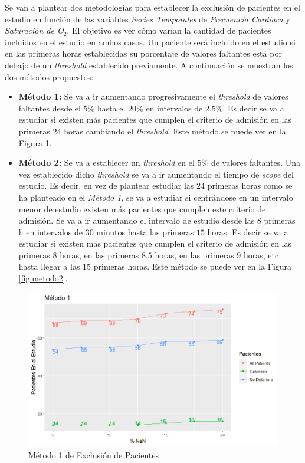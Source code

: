 \newpage

Se van a plantear dos metodologías para establecer la exclusión de pacientes en el estudio en función de las variables \textit{Series Temporales} de \textit{Frecuencia Cardiaca} y \textit{Saturación de O$_2$}. El objetivo es ver cómo varían la cantidad de pacientes incluidos en el estudio en ambos casos. Un paciente será incluido en el estudio si en las primeras horas establecidas su porcentaje de valores faltantes está por debajo de un \textit{threshold} establecido previamente. A continuación se muestran los dos métodos propuestos: 

\begin{itemize}
    \item \textbf{Método 1:} Se va a ir aumentando progresivamente el \textit{threshold} de valores faltantes desde el $5 \%$ hasta el $20 \%$ en intervalos de $2.5 \%$.  Es decir se va a estudiar si existen más pacientes que cumplen el criterio de admisión en las primeras $24$ horas cambiando el \textit{threshold}. Este método se puede ver en la Figura \ref{fig:metodo1}.
    \item \textbf{Método 2:} Se va a establecer un \textit{threshold} en el $5 \%$ de valores faltantes. Una vez establecido dicho \textit{threshold} se va a ir aumentando el tiempo de \textit{scope} del estudio. Es decir, en vez de plantear estudiar las $24$ primeras horas como se ha planteado en el \textit{Método 1}, se va a estudiar si centrándose en un intervalo menor de estudio existen más pacientes que cumplen este criterio de admisión. Se va a ir aumentando el intervalo de estudio desde las $8$ primeras h en intervalos de $30$ minutos hasta las primeras $15$ horas. Es decir se va a estudiar si existen más pacientes que cumplen el criterio de admisión en las primeras $8$ horas, en las primeras $8.5$ horas, en las primeras $9$ horas, etc. hasta llegar a las $15$ primeras horas. Este método se puede ver en la Figura \ref{fig:metodo2}.
\end{itemize}

\begin{figure}[H]
    \centering
    \includegraphics[scale = 1]{./img/metodo1.png}
    \caption{Método 1 de Exclusión de Pacientes}
    \label{fig:metodo1}
\end{figure}

